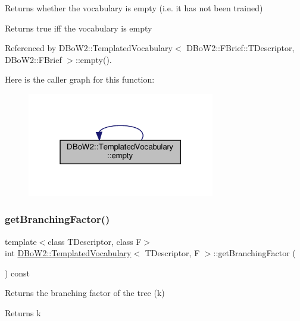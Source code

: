 Returns whether the vocabulary is empty (i.\+e. it has not been trained) \begin{DoxyReturn}{Returns}
true iff the vocabulary is empty 
\end{DoxyReturn}


Referenced by D\+Bo\+W2\+::\+Templated\+Vocabulary$<$ D\+Bo\+W2\+::\+F\+Brief\+::\+T\+Descriptor, D\+Bo\+W2\+::\+F\+Brief $>$\+::empty().

Here is the caller graph for this function\+:\nopagebreak
\begin{figure}[H]
\begin{center}
\leavevmode
\includegraphics[width=232pt]{classDBoW2_1_1TemplatedVocabulary_ad7bbb3cf53f8f9f3610b9b67c551ba8e_icgraph}
\end{center}
\end{figure}
\mbox{\label{classDBoW2_1_1TemplatedVocabulary_a027d367760c39de816bee5ff0d969837}} 
\subsubsection{\texorpdfstring{get\+Branching\+Factor()}{getBranchingFactor()}}
{\footnotesize\ttfamily template$<$class T\+Descriptor, class F$>$ \\
int \hyperlink{classDBoW2_1_1TemplatedVocabulary}{D\+Bo\+W2\+::\+Templated\+Vocabulary}$<$ T\+Descriptor, F $>$\+::get\+Branching\+Factor (\begin{DoxyParamCaption}{ }\end{DoxyParamCaption}) const\hspace{0.3cm}{\ttfamily [inline]}}

Returns the branching factor of the tree (k) \begin{DoxyReturn}{Returns}
k 
\end{DoxyReturn}


